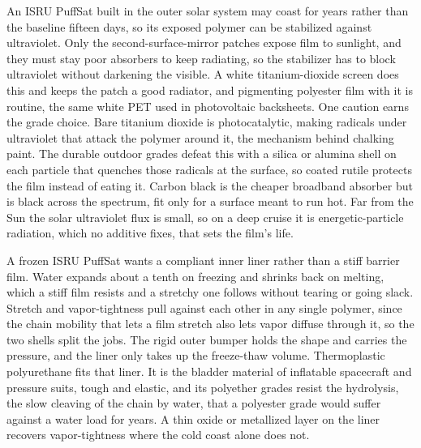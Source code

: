 \documentclass{article}
\begin{document}
An ISRU PuffSat built in the outer solar system may coast for years rather than the baseline fifteen days, so its exposed polymer can be stabilized against ultraviolet. Only the second-surface-mirror patches expose film to sunlight, and they must stay poor absorbers to keep radiating, so the stabilizer has to block ultraviolet without darkening the visible. A white titanium-dioxide screen does this and keeps the patch a good radiator, and pigmenting polyester film with it is routine, the same white PET used in photovoltaic backsheets. One caution earns the grade choice. Bare titanium dioxide is photocatalytic, making radicals under ultraviolet that attack the polymer around it, the mechanism behind chalking paint. The durable outdoor grades defeat this with a silica or alumina shell on each particle that quenches those radicals at the surface, so coated rutile protects the film instead of eating it. Carbon black is the cheaper broadband absorber but is black across the spectrum, fit only for a surface meant to run hot. Far from the Sun the solar ultraviolet flux is small, so on a deep cruise it is energetic-particle radiation, which no additive fixes, that sets the film's life.

A frozen ISRU PuffSat wants a compliant inner liner rather than a stiff barrier film. Water expands about a tenth on freezing and shrinks back on melting, which a stiff film resists and a stretchy one follows without tearing or going slack. Stretch and vapor-tightness pull against each other in any single polymer, since the chain mobility that lets a film stretch also lets vapor diffuse through it, so the two shells split the jobs. The rigid outer bumper holds the shape and carries the pressure, and the liner only takes up the freeze-thaw volume. Thermoplastic polyurethane fits that liner. It is the bladder material of inflatable spacecraft and pressure suits, tough and elastic, and its polyether grades resist the hydrolysis, the slow cleaving of the chain by water, that a polyester grade would suffer against a water load for years. A thin oxide or metallized layer on the liner recovers vapor-tightness where the cold coast alone does not.
\end{document}

